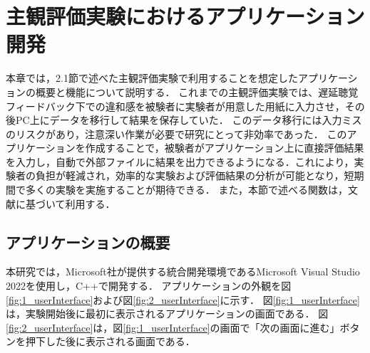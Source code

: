 \chapter{主観評価実験におけるアプリケーション開発}
本章では，2.1節で述べた主観評価実験で利用することを想定したアプリケーションの概要と機能について説明する．
これまでの主観評価実験では、遅延聴覚フィードバック下での違和感を被験者に実験者が用意した用紙に入力させ，その後PC上にデータを移行して結果を保存していた．
このデータ移行には入力ミスのリスクがあり，注意深い作業が必要で研究にとって非効率であった．
このアプリケーションを作成することで，被験者がアプリケーション上に直接評価結果を入力し，自動で外部ファイルに結果を出力できるようになる．これにより，実験者の負担が軽減され，効率的な実験および評価結果の分析が可能となり，短期間で多くの実験を実施することが期待できる．
また，本節で述べる関数は，文献\cite{Win32API-reference}に基づいて利用する．

\section{アプリケーションの概要}
本研究では，Microsoft社が提供する統合開発環境であるMicrosoft Visual Studio 2022を使用し，C++で開発する．
アプリケーションの外観を図\ref{fig:1_userInterface}および図\ref{fig:2_userInterface}に示す．
図\ref{fig:1_userInterface}は，実験開始後に最初に表示されるアプリケーションの画面である．
図\ref{fig:2_userInterface}は，図\ref{fig:1_userInterface}の画面で「次の画面に進む」ボタンを押下した後に表示される画面である．

